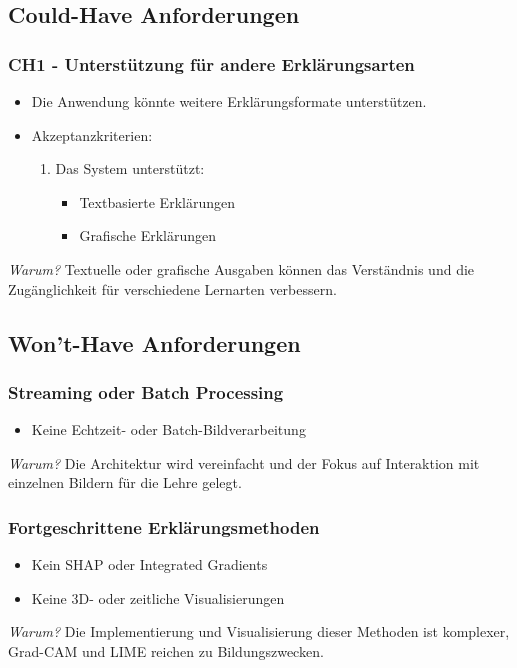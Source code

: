 \subsection{Could-Have Anforderungen}

\subsubsection{CH1 - Unterstützung für andere Erklärungsarten}
\begin{itemize}
    \item Die Anwendung könnte weitere Erklärungsformate unterstützen.
    \item Akzeptanzkriterien:
    \begin{enumerate}
        \item Das System unterstützt:
            \begin{itemize}
                \item Textbasierte Erklärungen
                \item Grafische Erklärungen
            \end{itemize}
    \end{enumerate}
\end{itemize}
\textit{Warum?} Textuelle oder grafische Ausgaben können das Verständnis und die Zugänglichkeit für verschiedene Lernarten verbessern.

\subsection{Won't-Have Anforderungen}

\subsubsection{Streaming oder Batch Processing}
\begin{itemize}
    \item Keine Echtzeit- oder Batch-Bildverarbeitung
\end{itemize}
\textit{Warum?} Die Architektur wird vereinfacht und der Fokus auf Interaktion mit einzelnen Bildern für die Lehre gelegt.

\subsubsection{Fortgeschrittene Erklärungsmethoden}
\begin{itemize}
    \item Kein SHAP oder Integrated Gradients
    \item Keine 3D- oder zeitliche Visualisierungen
\end{itemize}
\textit{Warum?} Die Implementierung und Visualisierung dieser Methoden ist komplexer, Grad-CAM und LIME reichen zu Bildungszwecken.

